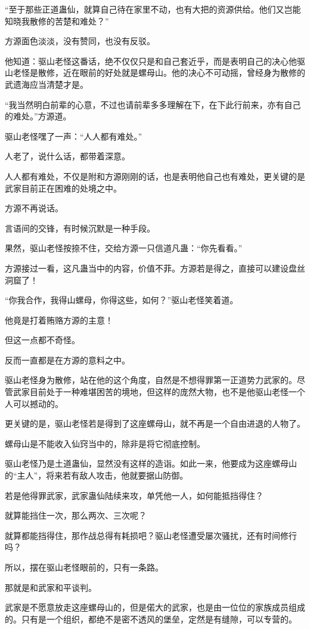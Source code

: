 \begin{this_body}
“至于那些正道蛊仙，就算自己待在家里不动，也有大把的资源供给。他们又岂能知晓我散修的苦楚和难处？”

方源面色淡淡，没有赞同，也没有反驳。

他知道：驱山老怪这番话，绝不仅仅只是和自己套近乎，而是表明自己的决心他驱山老怪是散修，近在眼前的好处就是螺母山。他的决心不可动摇，曾经身为散修的武遗海应当清楚才是。

“我当然明白前辈的心意，不过也请前辈多多理解在下，在下此行前来，亦有自己的难处。”方源道。

驱山老怪嘿了一声：“人人都有难处。”

人老了，说什么话，都带着深意。

人人都有难处，不仅是附和方源刚刚的话，也是表明他自己也有难处，更关键的是武家目前正在困难的处境之中。

方源不再说话。

言语间的交锋，有时候沉默是一种手段。

果然，驱山老怪按捺不住，交给方源一只信道凡蛊：“你先看看。”

方源接过一看，这凡蛊当中的内容，价值不菲。方源若是得之，直接可以建设盘丝洞窟了！

“你我合作，我得山螺母，你得这些，如何？”驱山老怪笑着道。

他竟是打着贿赂方源的主意！

但这一点都不奇怪。

反而一直都是在方源的意料之中。

驱山老怪身为散修，站在他的这个角度，自然是不想得罪第一正道势力武家的。尽管武家目前处于一种难堪困苦的境地，但这样的庞然大物，也不是他驱山老怪一个人可以撼动的。

更关键的是，驱山老怪若是得到了这座螺母山，就不再是一个自由进退的人物了。

螺母山是不能收入仙窍当中的，除非是将它彻底控制。

驱山老怪乃是土道蛊仙，显然没有这样的造诣。如此一来，他要成为这座螺母山的“主人”，将来若有敌人攻击，他就要据山防御。

若是他得罪武家，武家蛊仙陆续来攻，单凭他一人，如何能抵挡得住？

就算能挡住一次，那么两次、三次呢？

就算都能挡得住，那作战总得有耗损吧？驱山老怪遭受屡次骚扰，还有时间修行吗？

所以，摆在驱山老怪眼前的，只有一条路。

那就是和武家和平谈判。

武家是不愿意放走这座螺母山的，但是偌大的武家，也是由一位位的家族成员组成的。只有是一个组织，都绝不是密不透风的堡垒，定然是有缝隙，可以专营的。


\end{this_body}
